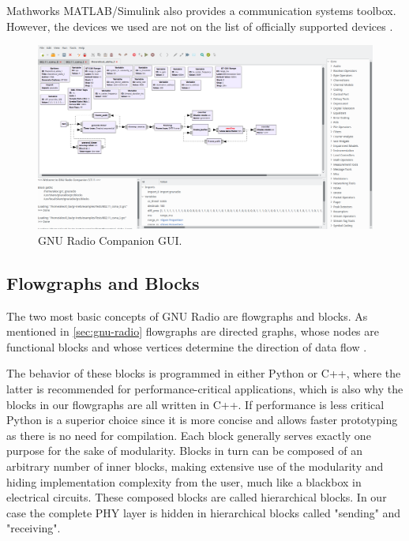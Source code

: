Mathworks MATLAB/Simulink also provides a communication systems toolbox. However, the devices we used are not on the list of officially supported devices \cite{Matlab}.

\begin{figure}[t]
	\label{fig:gnuradio}
	\begin{center}
		\includegraphics[width=\textwidth,valign=c]{pictures/grc_ui}
	\end{center}
	\caption{GNU Radio Companion GUI.}
\end{figure}

\subsection{Flowgraphs and Blocks}
\label{sec:flowgraphs}
The two most basic concepts of GNU Radio are flowgraphs and blocks. As mentioned in \ref{sec:gnu-radio} flowgraphs are directed graphs, whose nodes are functional blocks and whose vertices determine the direction of data flow \cite{GR1}. 

The behavior of these blocks is programmed in either Python or C++, where the latter is recommended for performance-critical applications, which is also why the blocks in our flowgraphs are all written in C++. If performance is less critical Python is a superior choice since it is more concise and allows faster prototyping as there is no need for compilation. Each block generally serves exactly one purpose for the sake of modularity. Blocks in turn can be composed of an arbitrary number of inner blocks, making extensive use of the modularity and hiding implementation complexity from the user, much like a blackbox in electrical circuits. These composed blocks are called hierarchical blocks. In our case the complete PHY layer is hidden in hierarchical blocks called "sending" and "receiving".

